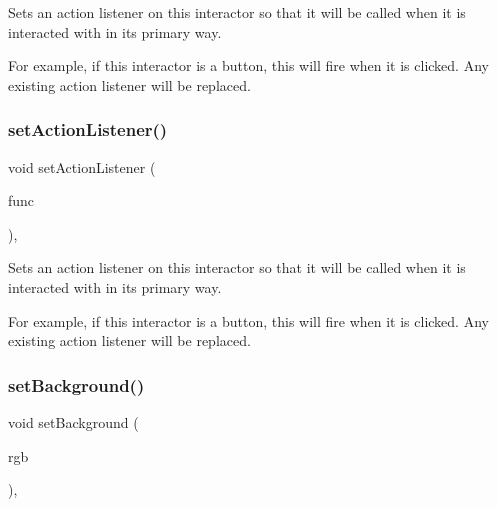 Sets an action listener on this interactor so that it will be called when it is interacted with in its primary way. 

For example, if this interactor is a button, this will fire when it is clicked. Any existing action listener will be replaced. \mbox{\label{classsgl_1_1GInteractor_aebd20a89c7a8a43a6fce999cf4f9fcf2}} 
\subsubsection{\texorpdfstring{set\+Action\+Listener()}{setActionListener()}\hspace{0.1cm}{\footnotesize\ttfamily [2/2]}}
{\footnotesize\ttfamily void set\+Action\+Listener (\begin{DoxyParamCaption}\item[{\mbox{\hyperlink{namespacesgl_a54427ce97bb1c2804e4fe2b0a62e8b17}{G\+Event\+Listener\+Void}}}]{func }\end{DoxyParamCaption})\hspace{0.3cm}{\ttfamily [virtual]}, {\ttfamily [inherited]}}



Sets an action listener on this interactor so that it will be called when it is interacted with in its primary way. 

For example, if this interactor is a button, this will fire when it is clicked. Any existing action listener will be replaced. \mbox{\label{classsgl_1_1GInteractor_acba7e546c2025c0a15ca4b4cc92043db}} 
\subsubsection{\texorpdfstring{set\+Background()}{setBackground()}\hspace{0.1cm}{\footnotesize\ttfamily [1/2]}}
{\footnotesize\ttfamily void set\+Background (\begin{DoxyParamCaption}\item[{int}]{rgb }\end{DoxyParamCaption})\hspace{0.3cm}{\ttfamily [virtual]}, {\ttfamily [inherited]}}



